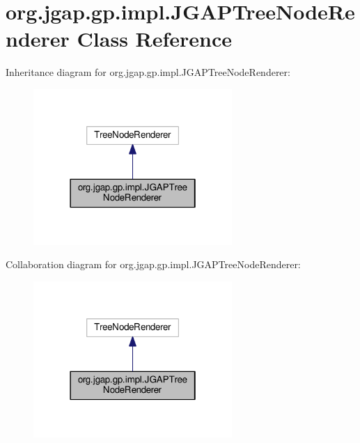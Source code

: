 \hypertarget{classorg_1_1jgap_1_1gp_1_1impl_1_1_j_g_a_p_tree_node_renderer}{\section{org.\-jgap.\-gp.\-impl.\-J\-G\-A\-P\-Tree\-Node\-Renderer Class Reference}
\label{classorg_1_1jgap_1_1gp_1_1impl_1_1_j_g_a_p_tree_node_renderer}
}


Inheritance diagram for org.\-jgap.\-gp.\-impl.\-J\-G\-A\-P\-Tree\-Node\-Renderer\-:
\nopagebreak
\begin{figure}[H]
\begin{center}
\leavevmode
\includegraphics[width=214pt]{classorg_1_1jgap_1_1gp_1_1impl_1_1_j_g_a_p_tree_node_renderer__inherit__graph}
\end{center}
\end{figure}


Collaboration diagram for org.\-jgap.\-gp.\-impl.\-J\-G\-A\-P\-Tree\-Node\-Renderer\-:
\nopagebreak
\begin{figure}[H]
\begin{center}
\leavevmode
\includegraphics[width=214pt]{classorg_1_1jgap_1_1gp_1_1impl_1_1_j_g_a_p_tree_node_renderer__coll__graph}
\end{center}
\end{figure}
